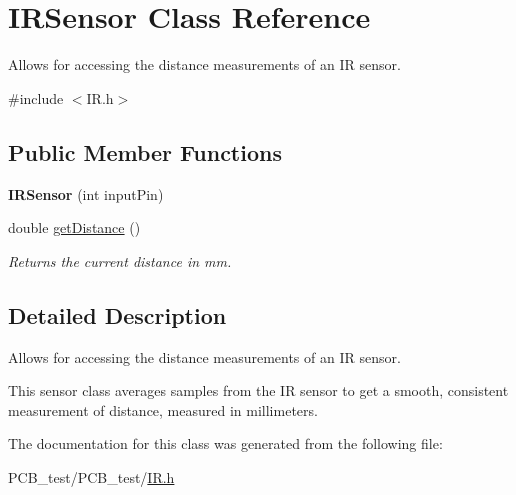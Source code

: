 \hypertarget{classIRSensor}{}\section{I\+R\+Sensor Class Reference}
\label{classIRSensor}


Allows for accessing the distance measurements of an IR sensor.  




{\ttfamily \#include $<$I\+R.\+h$>$}

\subsection*{Public Member Functions}
\begin{DoxyCompactItemize}
\item 
\mbox{\label{classIRSensor_a97ef6ff6b552e5d8e2b378a0a373f463}} 
{\bfseries I\+R\+Sensor} (int input\+Pin)
\item 
\mbox{\label{classIRSensor_a9567c1b225037c6958b4b20ebff92d81}} 
double \hyperlink{classIRSensor_a9567c1b225037c6958b4b20ebff92d81}{get\+Distance} ()
\begin{DoxyCompactList}\small\item\em Returns the current distance in mm. \end{DoxyCompactList}\end{DoxyCompactItemize}


\subsection{Detailed Description}
Allows for accessing the distance measurements of an IR sensor. 

This sensor class averages samples from the IR sensor to get a smooth, consistent measurement of distance, measured in millimeters. 

The documentation for this class was generated from the following file\+:\begin{DoxyCompactItemize}
\item 
P\+C\+B\+\_\+test/\+P\+C\+B\+\_\+test/\hyperlink{IR_8h}{I\+R.\+h}\end{DoxyCompactItemize}
